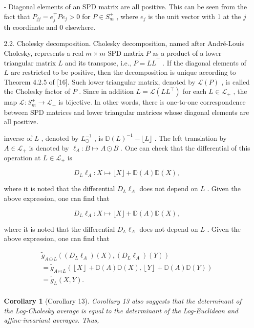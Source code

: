 \documentclass[11pt]{article}
\newtheorem{corollary}{Corollary}
\begin{document}
- Diagonal elements of an SPD matrix are all positive. This can be seen from the fact that  $P_{jj} = e_j^\top Pe_j > 0$  for  $P \in S_m^+$ , where  $e_j$  is the unit vector with 1 at the  $j$ th coordinate and 0 elsewhere.

2.2. Cholesky decomposition. Cholesky decomposition, named after André-Louis Cholesky, represents a real  $m \times m$  SPD matrix  $P$  as a product of a lower triangular matrix  $L$  and its transpose, i.e.,  $P = LL^{\top}$ . If the diagonal elements of  $L$  are restricted to be positive, then the decomposition is unique according to Theorem 4.2.5 of [16]. Such lower triangular matrix, denoted by  $\mathcal{L}(P)$ , is called the Cholesky factor of  $P$ . Since in addition  $L = \mathcal{L}(LL^{\top})$  for each  $L \in \mathcal{L}_{+}$ , the map  $\mathcal{L}: S_{m}^{+} \to \mathcal{L}_{+}$  is bijective. In other words, there is one-to-one correspondence between SPD matrices and lower triangular matrices whose diagonal elements are all positive.

inverse of  $L$ , denoted by  $L_{\odot}^{-1}$ , is  $\mathbb{D}(L)^{-1} - \lfloor L\rfloor$ . The left translation by  $A\in \mathcal{L}_{+}$  is denoted by  $\ell_A:B\mapsto A\odot B$ . One can check that the differential of this operation at  $L\in \mathcal{L}_{+}$  is

$$
D _ {L} \ell_ {A}: X \mapsto \lfloor X \rfloor + \mathbb {D} (A) \mathbb {D} (X), \tag {3.2}
$$

where it is noted that the differential  $D_{L}\ell_{A}$  does not depend on  $L$ . Given the above expression, one can find that

$$
D _ {L} \ell_ {A}: X \mapsto \lfloor X \rfloor + \mathbb {D} (A) \mathbb {D} (X), \tag {3.2}
$$

where it is noted that the differential  $D_{L}\ell_{A}$  does not depend on  $L$ . Given the above expression, one can find that

$$
\begin{array}{l} \tilde {g} _ {A \odot L} ((D _ {L} \ell_ {A}) (X), (D _ {L} \ell_ {A}) (Y)) \\ = \tilde {g} _ {A \odot L} (\left\lfloor X \right\rfloor + \mathbb {D} (A) \mathbb {D} (X), \left\lfloor Y \right\rfloor + \mathbb {D} (A) \mathbb {D} (Y)) \\ = \tilde {g} _ {L} (X, Y). \\ \end{array}
$$


\begin{corollary}[Corollary 13]
Corollary 13 also suggests that the determinant of the Log-Cholesky average is equal to the determinant of the Log-Euclidean and affine-invariant averages. Thus,
\end{corollary}
\end{document}
